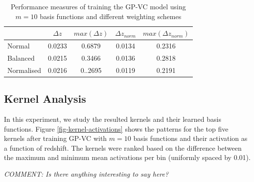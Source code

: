 \documentclass[useAMS,usenatbib,fleqn]{mn2e}
\begin{document}
 \begin{table}
\caption{Performance measures of training the GP-VC model using $m=10$ basis functions and different weighting schemes}
\begin{center}
  \begin{tabular}{| l | c | c | c | c |}
     				&	$\Delta z$	&	$max(\Delta z)$		&	$\Delta z_{norm}$		&	$max(\Delta z_{norm})$	\\	\hline
	Normal		&	0.0233		&	0.6879				&	0.0134				&	0.2316					\\
	Balanced	&	0.0215		&	0.3466				&	0.0136				&	0.2818					\\
	Normalised	&	0.0216		&	0..2695				&	0.0119				&	0.2191					\\	\hline
  \end{tabular}
  \label{table-normal-balanced}
\end{center}
\end{table}

\subsection{Kernel Analysis}
In this experiment, we study the resulted kernels and their learned basis functions. Figure \ref{fig-kernel-activations} shows the patterns for the top five kernels after training GP-VC with $m=10$ basis functions and their activation as a function of redshift. The kernels were ranked based on the difference between the maximum and minimum mean activations per bin (uniformly spaced by 0.01).

\textit{COMMENT: Is there anything interesting to say here?}
\end{document}
